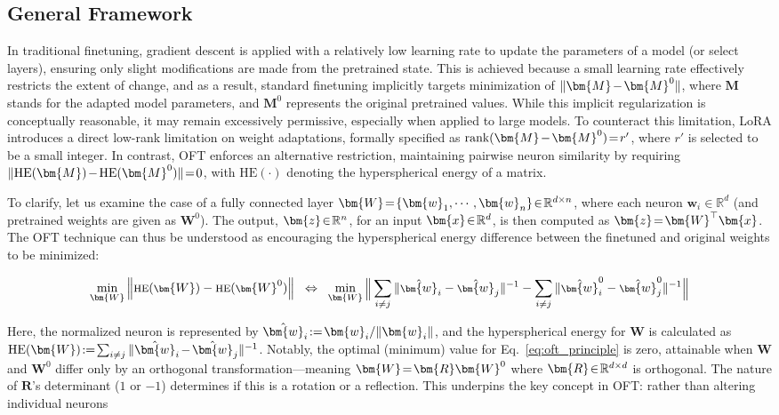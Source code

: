 \subsection{General Framework}

In traditional finetuning, gradient descent is applied with a relatively low learning rate to update the parameters of a model (or select layers), ensuring only slight modifications are made from the pretrained state. This is achieved because a small learning rate effectively restricts the extent of change, and as a result, standard finetuning implicitly targets minimization of $\thickmuskip=2mu \medmuskip=2mu \| \bm{M} - \bm{M}^0\|$, where $\bm{M}$ stands for the adapted model parameters, and $\bm{M}^0$ represents the original pretrained values. While this implicit regularization is conceptually reasonable, it may remain excessively permissive, especially when applied to large models. To counteract this limitation, LoRA introduces a direct low-rank limitation on weight adaptations, formally specified as $\thickmuskip=2mu \medmuskip=2mu \text{rank}(\bm{M} - \bm{M}^0)=r'$, where $r'$ is selected to be a small integer. In contrast, OFT enforces an alternative restriction, maintaining pairwise neuron similarity by requiring $\thickmuskip=2mu \medmuskip=2mu \| \text{HE}(\bm{M})-\text{HE}(\bm{M}^0) \|=0$, with $\text{HE}(\cdot)$ denoting the hyperspherical energy of a matrix. 

To clarify, let us examine the case of a fully connected layer $\thickmuskip=2mu \medmuskip=2mu \bm{W}=\{\bm{w}_1,\cdots,\bm{w}_n\}\in\mathbb{R}^{d\times n}$, where each neuron $\bm{w}_i\in\mathbb{R}^{d}$ (and pretrained weights are given as $\bm{W}^0$). The output, $\thickmuskip=2mu \medmuskip=2mu \bm{z}\in\mathbb{R}^n$, for an input $\thickmuskip=2mu \medmuskip=2mu \bm{x}\in\mathbb{R}^d$, is then computed as $\thickmuskip=2mu \medmuskip=2mu \bm{z}=\bm{W}^\top\bm{x}$. The OFT technique can thus be understood as encouraging the hyperspherical energy difference between the finetuned and original weights to be minimized:

\begin{equation}\label{eq:oft_principle}
\footnotesize
\min_{\bm{W}} \left\| \text{HE}(\bm{W})-\text{HE}(\bm{W}^0)\right\|~~\Leftrightarrow~~\min_{\bm{W}} \bigg{\|} \sum_{i\neq j} \|\hat{\bm{w}}_i-\hat{\bm{w}}_j\|^{-1}-\sum_{i\neq j} \|\hat{\bm{w}}^0_i-\hat{\bm{w}}^0_j\|^{-1}\bigg{\|}
\end{equation}

Here, the normalized neuron is represented by $\thickmuskip=2mu \medmuskip=2mu \hat{\bm{w}}_i:=\bm{w}_i/\|\bm{w}_i\|$, and the hyperspherical energy for $\bm{W}$ is calculated as $\thickmuskip=2mu \medmuskip=2mu \text{HE}(\bm{W}):= \sum_{i\neq j} \|\hat{\bm{w}}_i-\hat{\bm{w}}_j\|^{-1}$. Notably, the optimal (minimum) value for Eq.~\eqref{eq:oft_principle} is zero, attainable when $\bm{W}$ and $\bm{W}^0$ differ only by an orthogonal transformation—meaning $\thickmuskip=2mu \medmuskip=2mu \bm{W}=\bm{R}\bm{W}^0$ where $\thickmuskip=2mu \medmuskip=2mu \bm{R}\in\mathbb{R}^{d\times d}$ is orthogonal. The nature of $\bm{R}$'s determinant ($1$ or $-1$) determines if this is a rotation or a reflection. This underpins the key concept in OFT: rather than altering individual neurons

